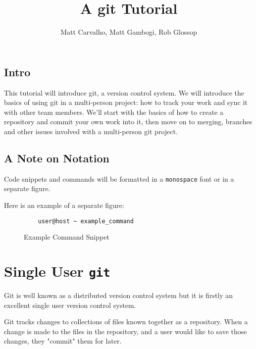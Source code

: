 \documentclass[11pt]{report}
\title{A git Tutorial}
\author{Matt Carvalho, Matt Gambogi, Rob Glossop}
\begin{document}
\thispagestyle{empty}
\maketitle

\clearpage {} 

\tableofcontents

\listoffigures

\clearpage {}
\section{Intro}
This tutorial will introduce git, a version control system. We will
introduce the basics of using git in a multi-person project: how to
track your work and sync it with other team members. We'll start with
the basics of how to create a repository and commit your own work into
it, then move on to merging, branches and other issues involved with a
multi-person git project.

\section{A Note on Notation}
Code snippets and commands will be formatted in a \texttt{monospace} font or in
a separate figure.

Here is an example of a separate figure:
\begin{figure}[h]
    \caption{Example Command Snippet}
    \begin{lstlisting}
    user@host ~ example_command
    \end{lstlisting}
\end{figure}

\chapter{Single User \texttt{git}}
Git is well known as a distributed version control system but it is
firstly an excellent single user version control system.

Git tracks changes to collections of files known together as a repository.
When a change is made to the files in the repository, and a user would like
to save those changes, they "commit" them for later.


\end{document}

